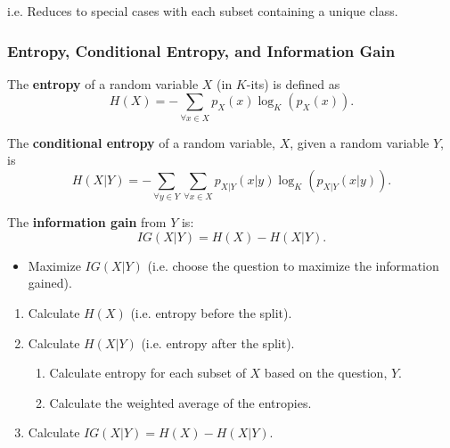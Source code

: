 \begin{notes}
    i.e. Reduces to special cases with each subset containing a unique class.
\end{notes}

\subsubsection{Entropy, Conditional Entropy, and Information Gain}
\begin{definition}
    The \textbf{entropy} of a random variable \(X\) (in \(K\)-its) is defined as
    \begin{equation*}
        H(X) = -\sum_{\forall x \in X} p_X(x) \log_K(p_X(x)).
    \end{equation*}

    The \textbf{conditional entropy} of a random variable, \(X\), given a random variable \(Y\), is
    \begin{equation*}
        H(X|Y) = -\sum_{\forall y \in Y} \sum_{\forall x \in X} p_{X|Y}(x | y) \log_K(p_{X|Y}(x|y)).
    \end{equation*}

    The \textbf{information gain} from \(Y\) is:
    \begin{equation*}
        IG(X|Y) = H(X) - H(X|Y).
    \end{equation*}
    \begin{itemize}
        \item Maximize \(IG(X|Y)\) (i.e. choose the question to maximize the information gained).
    \end{itemize}
\end{definition}
\newpage

\begin{process}
    \begin{enumerate}
        \item Calculate \(H(X)\) (i.e. entropy before the split).
        \item Calculate \(H(X|Y)\) (i.e. entropy after the split).
        \begin{enumerate}
            \item Calculate entropy for each subset of \(X\) based on the question, \(Y\).
            \item Calculate the weighted average of the entropies.
        \end{enumerate}
        \item Calculate \(IG(X|Y) = H(X) - H(X|Y)\).
    \end{enumerate}
\end{process}

